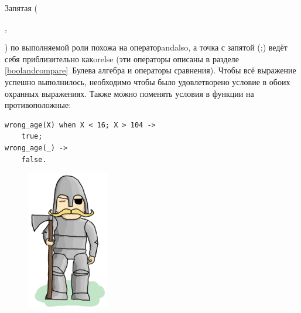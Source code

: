 \documentclass[a4paper,12pt]{report}
\newcommand{\ops}{\colorbox{lgreen}}
\begin{document}
Запятая (\ops{\strut,}) по выполняемой роли похожа на оператор\ops{andalso}, а точка с запятой (\ops{;}) ведёт себя приблизительно как\ops{orelse} (эти операторы описаны в разделе \ref{boolandcompare}{~Булева алгебра и операторы сравнения}). Чтобы всё выражение успешно выполнилось, необходимо чтобы было удовлетворено условие в обоих охранных выражениях. Также можно поменять условия в функции на противоположные:
\begin{lstlisting}[style=erlang]
wrong_age(X) when X < 16; X > 104 ->
    true;
wrong_age(_) ->
    false.
\end{lstlisting}
\begin{figure}
    \includegraphics[width=1\linewidth]{guard.png}
\end{figure}
\end{document}
